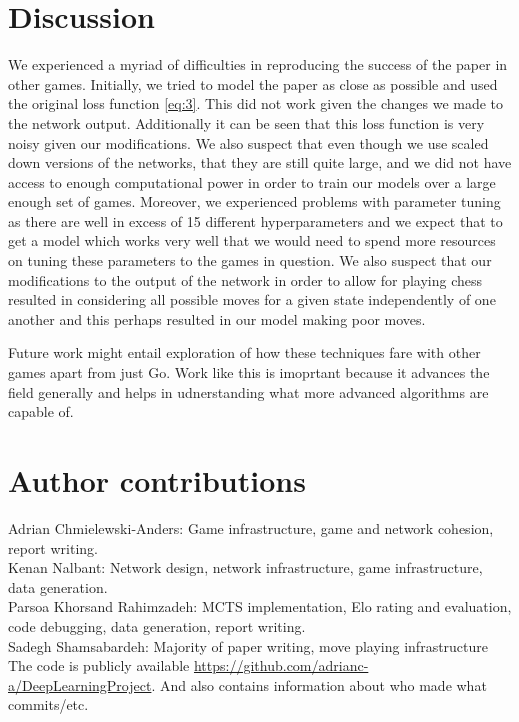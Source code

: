 \documentclass[english]{article}
\begin{document}
\section{Discussion}
We experienced a myriad of difficulties in reproducing the success of the paper
in other games.
Initially, we tried to model the paper as close as possible and used the
original loss function \ref{eq:3}. This did not work given the changes we made
to the network output. Additionally it can be seen that this loss function is
very noisy given our modifications.
We also suspect that even though we use scaled down versions of the networks,
that they are still quite large, and we did not have access to enough
computational power in order to train our models over a large enough set of
games. Moreover, we experienced problems with parameter tuning as there are well
in excess of 15 different hyperparameters and we expect that to get a model
which works very well that we would need to spend more resources on tuning these
parameters to the games in question. We also suspect that our modifications to
the output of the network in order to allow for playing chess resulted in
considering all possible moves for a given state independently of one another
and this perhaps resulted in our model making poor moves.

Future work might entail exploration of how these techniques fare with other
games apart from just Go. Work like this is imoprtant because it advances the
field generally and helps in udnerstanding what more advanced algorithms are
capable of.

\clearpage



\section{Author contributions}
Adrian Chmielewski-Anders: Game infrastructure, game and network cohesion, report writing.\\
Kenan Nalbant: Network design, network infrastructure, game infrastructure, data generation.\\
Parsoa Khorsand Rahimzadeh: MCTS implementation, Elo rating and evaluation, code debugging, data generation, report writing.\\
Sadegh Shamsabardeh: Majority of paper writing, move playing infrastructure
The code is publicly available
\href{https://github.com/adrianc-a/DeepLearningProject}{https://github.com/adrianc-a/DeepLearningProject}.
And also contains information about who made what commits/etc.
\end{document}
